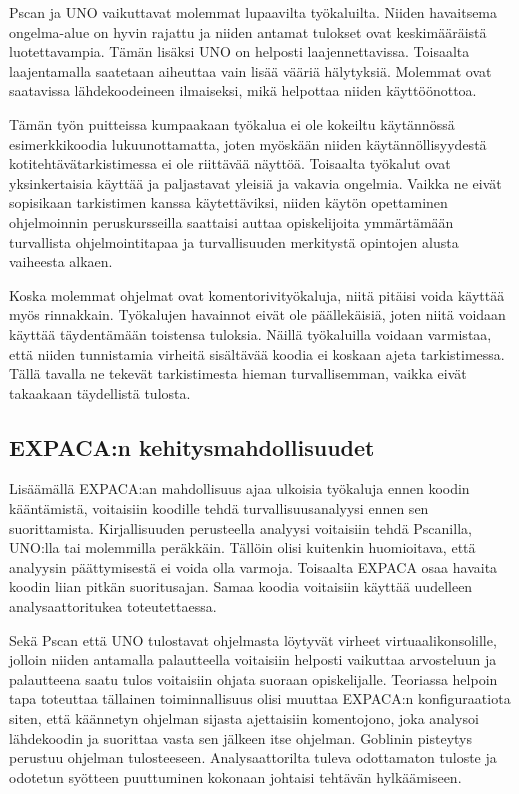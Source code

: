 Pscan ja UNO vaikuttavat molemmat lupaavilta työkaluilta. Niiden havaitsema
ongelma-alue on hyvin rajattu ja niiden antamat tulokset ovat keskimääräistä
luotettavampia. Tämän lisäksi UNO on helposti laajennettavissa. Toisaalta
laajentamalla saatetaan aiheuttaa vain lisää vääriä hälytyksiä. Molemmat ovat
saatavissa lähdekoodeineen ilmaiseksi, mikä helpottaa niiden käyttöönottoa.

Tämän työn puitteissa kumpaakaan työkalua ei ole kokeiltu käytännössä
esimerkkikoodia lukuunottamatta, joten myöskään niiden käytännöllisyydestä
kotitehtävätarkistimessa ei ole riittävää näyttöä. Toisaalta työkalut ovat
yksinkertaisia käyttää ja paljastavat yleisiä ja vakavia ongelmia. Vaikka ne
eivät sopisikaan tarkistimen kanssa käytettäviksi, niiden käytön opettaminen
ohjelmoinnin peruskursseilla saattaisi auttaa opiskelijoita ymmärtämään
turvallista ohjelmointitapaa ja turvallisuuden merkitystä opintojen alusta
vaiheesta alkaen.

Koska molemmat ohjelmat ovat komentorivityökaluja, niitä pitäisi voida käyttää
myös rinnakkain. Työkalujen havainnot eivät ole päällekäisiä, joten niitä
voidaan käyttää täydentämään toistensa tuloksia. Näillä työkaluilla voidaan
varmistaa, että niiden tunnistamia virheitä sisältävää koodia ei koskaan ajeta
tarkistimessa. Tällä tavalla ne tekevät tarkistimesta hieman turvallisemman,
vaikka eivät takaakaan täydellistä tulosta.

\subsection{EXPACA:n kehitysmahdollisuudet}

Lisäämällä EXPACA:an mahdollisuus ajaa ulkoisia työkaluja ennen koodin
kääntämistä, voitaisiin koodille tehdä turvallisuusanalyysi ennen sen
suorittamista. Kirjallisuuden perusteella analyysi voitaisiin tehdä Pscanilla,
UNO:lla tai molemmilla peräkkäin. Tällöin olisi kuitenkin huomioitava, että
analyysin päättymisestä ei voida olla varmoja. Toisaalta EXPACA osaa havaita
koodin liian pitkän suoritusajan. Samaa koodia voitaisiin käyttää uudelleen
analysaattoritukea toteutettaessa.

Sekä Pscan että UNO tulostavat ohjelmasta löytyvät virheet virtuaalikonsolille,
jolloin niiden antamalla palautteella voitaisiin helposti vaikuttaa arvosteluun
ja palautteena saatu tulos voitaisiin ohjata suoraan opiskelijalle. Teoriassa
helpoin tapa toteuttaa tällainen toiminnallisuus olisi muuttaa EXPACA:n
konfiguraatiota siten, että käännetyn ohjelman sijasta ajettaisiin komentojono,
joka analysoi lähdekoodin ja suorittaa vasta sen jälkeen itse ohjelman. Goblinin
pisteytys perustuu ohjelman tulosteeseen. Analysaattorilta tuleva odottamaton
tuloste ja odotetun syötteen puuttuminen kokonaan johtaisi tehtävän hylkäämiseen.

